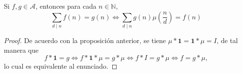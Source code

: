 \begin{corollary}\label{cor:mob1}
Si $f,g \in \mathcal{A}$, entonces para cada $n \in \mathbb{N}$,
\begin{equation*}
    \sum_{d \mid n} f(n) = g(n) \iff \sum_{d \mid n} g(n)\mu \left( \frac{n}{d} \right) = f(n)
\end{equation*}
\end{corollary}
\begin{proof}
De acuerdo con la proposición anterior, se tiene $\mu*\mathbf{1}=\mathbf{1}*\mu=I$, de tal manera que
\begin{equation*}
    f*\mathbf{1} =  g \iff f*\mathbf{1}*\mu = g * \mu \iff f*I = g * \mu \iff f = g * \mu,
\end{equation*}
lo cual es equivalente al enunciado.
\end{proof}

